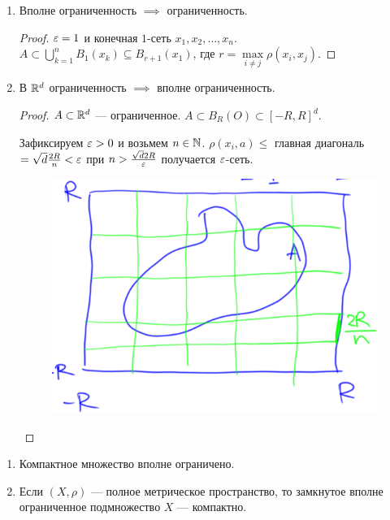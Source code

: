 \begin{properties}
    \begin{enumerate}
        \item Вполне ограниченность $\implies$ ограниченность.
             \begin{proof}
                $\varepsilon = 1$ и конечная  $1$-сеть  $x_1, x_2,\ldots,x_n$. $A \subset \bigcup\limits_{k=1}^n B_1(x_k) \subseteq B_{r+1}(x_1)$, где $r = \max\limits_{i \neq j} \rho(x_i, x_j)$.
            \end{proof}
        \item В $\mathbb{R}^d$ ограниченность  $\implies$ вполне ограниченность. 
             \begin{proof}
                $A \subset \mathbb{R}^d$ --- ограниченное.  $A \subset B_R(O) \subset [-R, R]^d$.

                Зафиксируем $\varepsilon > 0$ и возьмем  $n \in \mathbb{N}$.  $\rho(x_i, a) \le$ главная диагональ $=\sqrt{d}\frac{2R}{n} < \varepsilon$ при $n > \frac{\sqrt{d} 2R}{\varepsilon}$ получается $\varepsilon$-сеть.
                \begin{figure}[h!]
                    \includegraphics[scale=0.5]{delone_set}
                \end{figure}
            \end{proof}
    \end{enumerate}
\end{properties}
\begin{theorem}[Хаусдорфа]
    \begin{enumerate}
        \item Компактное множество вполне ограничено.
        \item Если $(X, \rho)$ --- полное метрическое пространство, то замкнутое вполне ограниченное подмножество  $X$ --- компактно.
    \end{enumerate}
\end{theorem}
